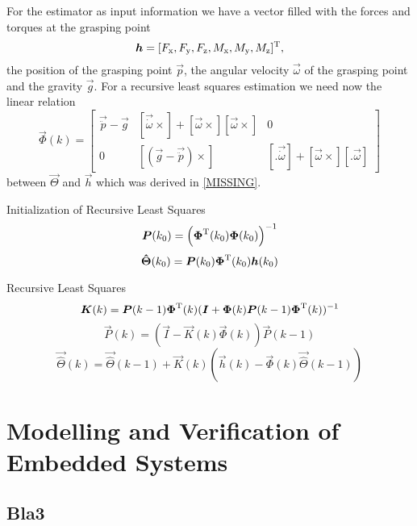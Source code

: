 For the estimator as input information we have a vector filled with the forces and torques at the grasping point
\begin{equation}
	\boldsymbol{h} = [F_{\mathrm{x}}, F_{\mathrm{y}}, F_{\mathrm{z}}, M_{\mathrm{x}}, M_{\mathrm{y}}, M_{\mathrm{z}}]^{\mathrm{T}},
\end{equation}
the position of the grasping point $\vec p$, the angular velocity $\vec \omega$ of the grasping point and the gravity $\vec g$. For a recursive least squares estimation we need now the linear relation
\begin{equation}
	\vec{\Phi}(k) = 
	\begin{bmatrix}
		\vec{\ddot p} - \vec{g}	& [\vec{\dot \omega} \times] + [\vec{\omega}\times] [\vec{\omega} \times]	& 0 \\
		0			& [(\vec{g} - \vec{\ddot p}) \times]									& [.  \vec{\dot \omega}] + [\vec{\omega} \times] [. \vec{\omega}]
	\end{bmatrix}
\end{equation}
between $\vec{\Theta}$ and $\vec{h}$ which was derived in \ref{MISSING}.

Initialization of Recursive Least Squares
\begin{equation}
	\boldsymbol{P}(k_0) = \left( \boldsymbol{\Phi}^{\mathrm{T}}(k_0) \boldsymbol{\Phi}(k_0) \right)^{-1}
\end{equation}
\begin{equation}
	\boldsymbol{\hat \Theta} (k_0) = \boldsymbol{P}(k_0) \boldsymbol{\Phi}^{\mathrm{T}}(k_0) \boldsymbol{h}(k_0)
\end{equation}

Recursive Least Squares
\begin{equation}
	\boldsymbol{K}(k) = \boldsymbol{P}(k-1) \boldsymbol{\Phi}^{\mathrm{T}}(k) (\boldsymbol{I} + \boldsymbol{\Phi}(k) \boldsymbol{P}(k - 1) \boldsymbol{\Phi}^{\mathrm{T}}(k))^{-1}
\end{equation}
\begin{equation}
	\vec{P}(k) = (\vec{I} - \vec{K}(k) \vec{\Phi}(k)) \vec{P}(k - 1)
\end{equation}
\begin{equation}
	\vec{\hat \Theta}(k)=\vec{ \hat \Theta}(k - 1) + \vec{K}(k) (\vec{h}(k) - \vec{\Phi}(k) \vec{\hat \Theta}(k - 1))
\end{equation}

\chapter{Modelling and Verification of Embedded Systems}

\section{Bla3}
\label{sec:bla3}
\lipsum[1] 
